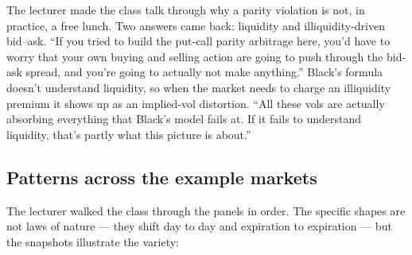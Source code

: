 The lecturer made the class talk through why a parity violation is
not, in practice, a free lunch. Two answers came back: liquidity and
illiquidity-driven bid--ask. ``If you tried to build the put-call
parity arbitrage here, you'd have to worry that your own buying and
selling action are going to push through the bid-ask spread, and
you're going to actually not make anything.'' Black's formula
doesn't understand liquidity, so when the market needs to charge an
illiquidity premium it shows up as an implied-vol distortion. ``All
these vols are actually absorbing everything that Black's model fails
at. If it fails to understand liquidity, that's partly what this
picture is about.''

\subsection{Patterns across the example markets}\label{L7-sec:pattern-tour}

The lecturer walked the class through the panels in order. The
specific shapes are not laws of nature --- they shift day to day and
expiration to expiration --- but the snapshots illustrate the variety:

